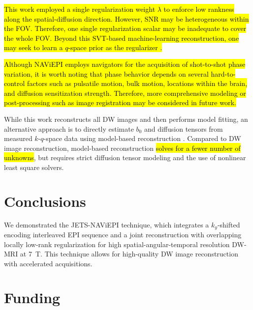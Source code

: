 \documentclass[preprint,12pt,authoryear,review]{elsarticle}
\begin{document}
    \hl{This work employed a single regularization weight \mbox{$\lambda$}
    to enforce low rankness along the spatial-diffusion direction.
    However, SNR may be heterogeneous within the FOV.
    Therefore, one single regularization scalar may be inadequate
    to cover the whole FOV.
    Beyond this SVT-based machine-learning reconstruction,
    one may seek to learn a $q$-space prior as the regularizer
    \mbox{\citep{hammernik_2018_varnet,lam_2019_mrsi,mani_2021_qmodel}}.}


    \hl{Although NAViEPI employs navigators for
    the acquisition of shot-to-shot phase variation,
    it is worth noting that phase behavior depends on
    several hard-to-control factors
    such as pulsatile motion, bulk motion,
    locations within the brain, and
    diffusion sensitization strength.
    Therefore, more comprehensive modeling or post-processing
    such as image registration may be considered in future work.}

    While this work reconstructs all DW images and
    then performs model fitting,
    an alternative approach is to directly estimate
    $b_0$ and diffusion tensors
    from measured $k$-$q$-space data
    using model-based reconstruction
    \citep{knoll_2015_mobadiff,dong_2018_mobadiff,shafieizargar_2023_adept}.
    Compared to DW image reconstruction,
    model-based reconstruction \hl{solves for a fewer number of unknowns}, 
    but requires strict diffusion tensor modeling
    and the use of nonlinear least square solvers.

    \section{Conclusions}
    \label{SEC:Conc}

    We demonstrated the JETS-NAViEPI technique, which integrates
    a $k_y$-shifted encoding interleaved EPI sequence and
    a joint reconstruction with overlapping locally low-rank regularization
    for high spatial-angular-temporal resolution DW-MRI at \SI{7}{\tesla}.
    This technique allows for high-quality DW image reconstruction
    with accelerated acquisitions.

    \section*{Funding}
\end{document}
